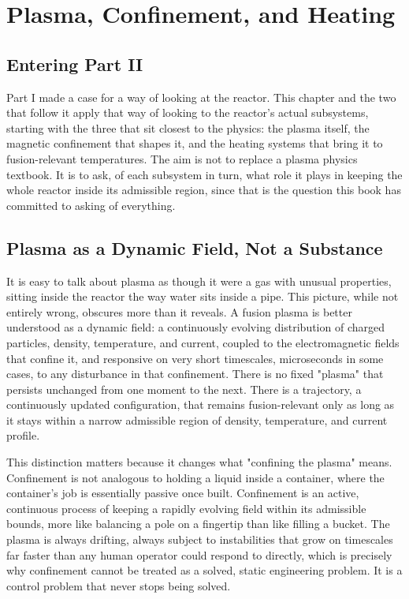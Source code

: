 \chapter{Plasma, Confinement, and Heating}

\section{Entering Part II}

Part I made a case for a way of looking at the reactor. This chapter and the two that follow it apply that way of looking to the reactor's actual subsystems, starting with the three that sit closest to the physics: the plasma itself, the magnetic confinement that shapes it, and the heating systems that bring it to fusion-relevant temperatures. The aim is not to replace a plasma physics textbook. It is to ask, of each subsystem in turn, what role it plays in keeping the whole reactor inside its admissible region, since that is the question this book has committed to asking of everything.

\section{Plasma as a Dynamic Field, Not a Substance}

It is easy to talk about plasma as though it were a gas with unusual properties, sitting inside the reactor the way water sits inside a pipe. This picture, while not entirely wrong, obscures more than it reveals. A fusion plasma is better understood as a dynamic field: a continuously evolving distribution of charged particles, density, temperature, and current, coupled to the electromagnetic fields that confine it, and responsive on very short timescales, microseconds in some cases, to any disturbance in that confinement. There is no fixed "plasma" that persists unchanged from one moment to the next. There is a trajectory, a continuously updated configuration, that remains fusion-relevant only as long as it stays within a narrow admissible region of density, temperature, and current profile.

This distinction matters because it changes what "confining the plasma" means. Confinement is not analogous to holding a liquid inside a container, where the container's job is essentially passive once built. Confinement is an active, continuous process of keeping a rapidly evolving field within its admissible bounds, more like balancing a pole on a fingertip than like filling a bucket. The plasma is always drifting, always subject to instabilities that grow on timescales far faster than any human operator could respond to directly, which is precisely why confinement cannot be treated as a solved, static engineering problem. It is a control problem that never stops being solved.

